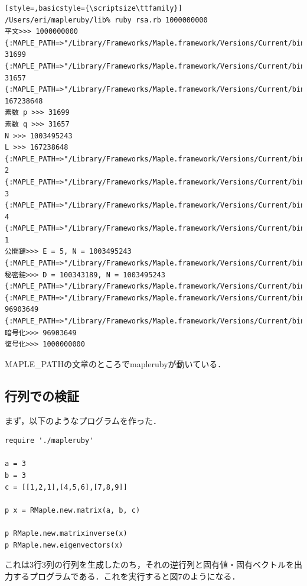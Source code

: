 \begin{lstlisting}[style=,basicstyle={\scriptsize\ttfamily}]
/Users/eri/mapleruby/lib% ruby rsa.rb 1000000000
平文>>> 1000000000
{:MAPLE_PATH=>"/Library/Frameworks/Maple.framework/Versions/Current/bin/maple"}
31699
{:MAPLE_PATH=>"/Library/Frameworks/Maple.framework/Versions/Current/bin/maple"}
31657
{:MAPLE_PATH=>"/Library/Frameworks/Maple.framework/Versions/Current/bin/maple"}
167238648
素数 p >>> 31699
素数 q >>> 31657
N >>> 1003495243
L >>> 167238648
{:MAPLE_PATH=>"/Library/Frameworks/Maple.framework/Versions/Current/bin/maple"}
2
{:MAPLE_PATH=>"/Library/Frameworks/Maple.framework/Versions/Current/bin/maple"}
3
{:MAPLE_PATH=>"/Library/Frameworks/Maple.framework/Versions/Current/bin/maple"}
4
{:MAPLE_PATH=>"/Library/Frameworks/Maple.framework/Versions/Current/bin/maple"}
1
公開鍵>>> E = 5, N = 1003495243
{:MAPLE_PATH=>"/Library/Frameworks/Maple.framework/Versions/Current/bin/maple"}
秘密鍵>>> D = 100343189, N = 1003495243
{:MAPLE_PATH=>"/Library/Frameworks/Maple.framework/Versions/Current/bin/maple"}
{:MAPLE_PATH=>"/Library/Frameworks/Maple.framework/Versions/Current/bin/maple"}
96903649
{:MAPLE_PATH=>"/Library/Frameworks/Maple.framework/Versions/Current/bin/maple"}
暗号化>>> 96903649
復号化>>> 1000000000
\end{lstlisting}\begin{description}
\item[MAPLE\_PATHの文章のところでmaplerubyが動いている．
]\end{description}
\subsection{行列での検証}
まず，以下のようなプログラムを作った．
\begin{lstlisting}[style=customRuby,basicstyle={\scriptsize\ttfamily}]
require './mapleruby'

a = 3
b = 3
c = [[1,2,1],[4,5,6],[7,8,9]]

p x = RMaple.new.matrix(a, b, c)

p RMaple.new.matrixinverse(x)
p RMaple.new.eigenvectors(x)
\end{lstlisting}
これは3行3列の行列を生成したのち，それの逆行列と固有値・固有ベクトルを出力するプログラムである．これを実行すると図7のようになる．

